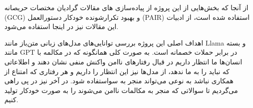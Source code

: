 
از آنجا که بخش‌هایی از این پروژه از پیاده‌سازی های مقالات گرادیان مختصات حریصانه (GCG)  و بهبود تکرارشونده خودکار دستورالعمل (PAIR)  استفاده شده است، از ادبیات این مقالات نیز در اینجا استفاده می‌شود.


اهداف اصلی این پروژه بررسی توانایی‌های مدل‌های زبانی متن‌باز مانند Llama و بسته مانند GPT در برابر حملات خصمانه است.
به صورت کلی همانگونه که در مکالمه با انسان‌ها ما انتظار داریم در قبال رفتارهای ناامن واکنش منفی نشان دهند و اطلاعاتی که نباید را به ما ندهد، از مدل‌ها نیز این انتظار را داریم و هر رفتاری که امتناع از همکاری نباشد به نوعی می‌تواند منجر به سواستفاده شود.
در آخر نیز در پی راهی می‌گردیم تا سوالاتی که منجر به مکالمات ناامن می‌شوند را به صورت خودکار تولید کنیم.
